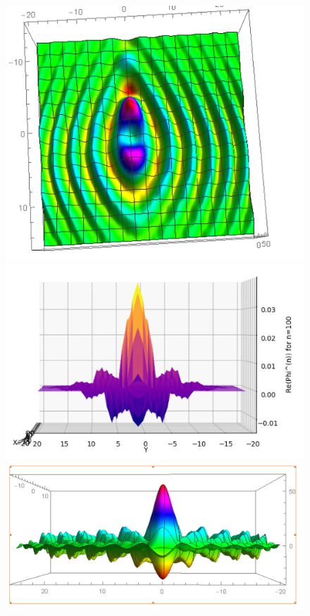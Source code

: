 \documentclass{article}
\theoremstyle{definition}
\begin{document}
\begin{figure}[!htb]
	\includegraphics[scale=0.5]{conv-3}\\
	\includegraphics[scale=0.4]{conv-4}
	\includegraphics[scale=0.4]{conv-5}
\end{figure}
\end{document}

